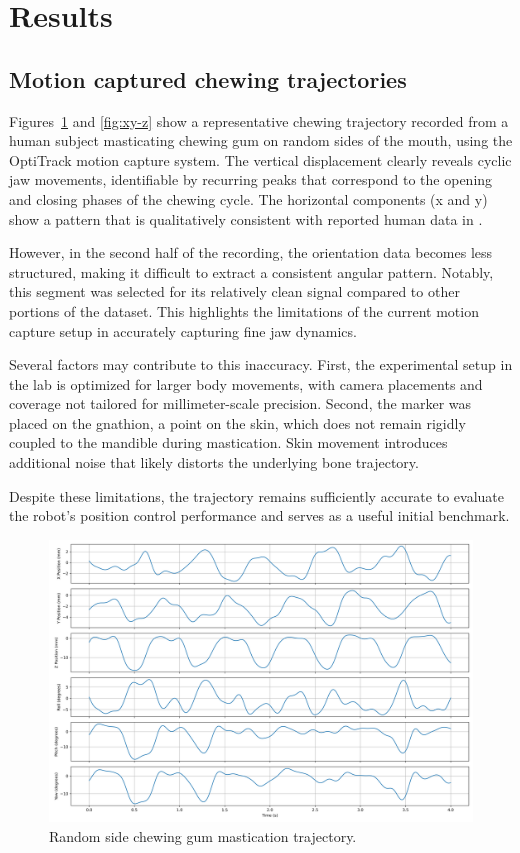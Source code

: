 \section{Results}
\subsection{Motion captured chewing trajectories}

Figures~\ref{fig:trajectory_plot} and \ref{fig:xy-z} show a representative chewing trajectory recorded from a human subject masticating chewing gum on random sides of the mouth, using the OptiTrack motion 
capture system. The vertical displacement clearly reveals cyclic jaw movements, identifiable by recurring peaks that correspond to the opening and closing 
phases of the chewing cycle. The horizontal components (x and y) show a pattern that is qualitatively consistent with reported human data in \cite{chewing_traj}.

However, in the second half of the recording, the orientation data becomes less structured, making it difficult to extract a consistent angular pattern. Notably, 
this segment was selected for its relatively clean signal compared to other portions of the dataset. This highlights the limitations of the current motion capture 
setup in accurately capturing fine jaw dynamics.

Several factors may contribute to this inaccuracy. First, the experimental setup in the lab is optimized for larger body movements, with camera placements and 
coverage not tailored for millimeter-scale precision. Second, the marker was placed on the gnathion, a point on the skin, which does not remain rigidly coupled 
to the mandible during mastication. Skin movement introduces additional noise that likely distorts the underlying bone trajectory.

Despite these limitations, the trajectory remains sufficiently accurate to evaluate the robot's position control performance and serves as a useful initial 
benchmark.

\begin{figure}[H]
    \centering
    \includegraphics[width=\textwidth]{figures/trajectory_plot.png}
    \caption{Random side chewing gum mastication trajectory.}
    \label{fig:trajectory_plot}
\end{figure}

